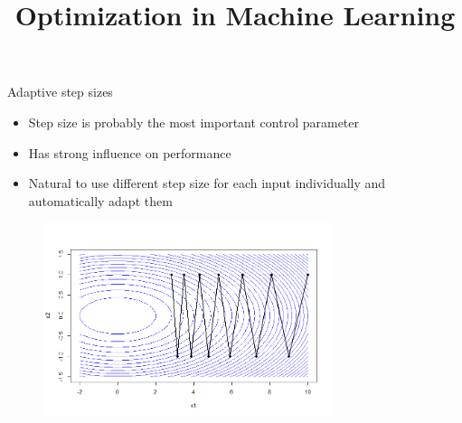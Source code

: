 \documentclass[11pt,compress,t,notes=noshow, xcolor=table]{beamer}
\title{Optimization in Machine Learning}
\date{}
\begin{document}
\sloppy

\begin{vbframe}{Adaptive step sizes}
	\begin{itemize}
		\item Step size is probably the most important control parameter
        \item Has strong influence on performance
		\item Natural to use different step size for each input individually and automatically adapt them
	\end{itemize}

    \vspace{-\baselineskip}
    
    \begin{figure}
        \centering
        \includegraphics[width=0.75\textwidth]{figure_man/momentum/sgd_without_momentum.png}
    \end{figure}
\end{vbframe}
\end{document}
